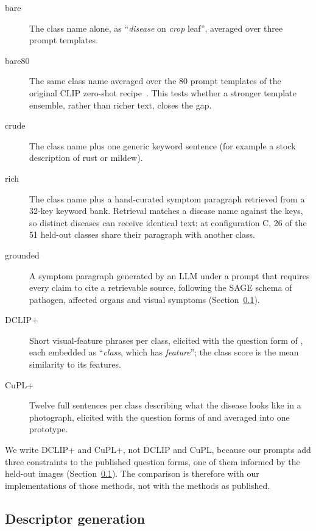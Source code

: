 \documentclass[a4paper,fleqn]{cas-dc}
\begin{document}
\begin{description}
\item[bare] The class name alone, as ``\emph{disease} on \emph{crop} leaf'', averaged over three
prompt templates.
\item[bare80] The same class name averaged over the 80 prompt templates of the original CLIP
zero-shot recipe~\citep{radford2021}. This tests whether a stronger template ensemble, rather than
richer text, closes the gap.
\item[crude] The class name plus one generic keyword sentence (for example a stock description of
rust or mildew).
\item[rich] The class name plus a hand-curated symptom paragraph retrieved from a 32-key keyword
bank. Retrieval matches a disease name against the keys, so distinct diseases can receive identical
text: at configuration C, 26 of the 51 held-out classes share their paragraph with another class.
\item[grounded] A symptom paragraph generated by an LLM under a prompt that requires every claim to
cite a retrievable source, following the SAGE schema of pathogen, affected organs and visual
symptoms (Section~\ref{sec:desc-gen}).
\item[DCLIP+] Short visual-feature phrases per class, elicited with the question form of
\citet{menon2023}, each embedded as ``\emph{class}, which has \emph{feature}''; the class score is the
mean similarity to its features.
\item[CuPL+] Twelve full sentences per class describing what the disease looks like in a photograph,
elicited with the question forms of \citet{pratt2023} and averaged into one prototype.
\end{description}

We write DCLIP+ and CuPL+, not DCLIP and CuPL, because our prompts add three constraints to the
published question forms, one of them informed by the held-out images
(Section~\ref{sec:desc-gen}). The comparison is therefore with our implementations of those
methods, not with the methods as published.

\subsection{Descriptor generation}
\label{sec:desc-gen}
\end{document}
